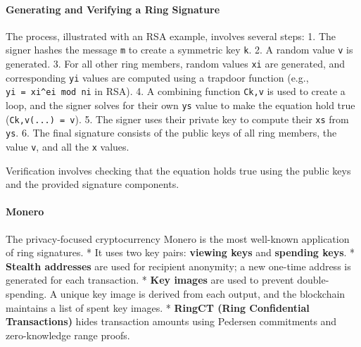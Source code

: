 \paragraph{Generating and Verifying a Ring
Signature}\label{generating-and-verifying-a-ring-signature}

The process, illustrated with an RSA example, involves several steps: 1.
The signer hashes the message \texttt{m} to create a symmetric key
\texttt{k}. 2. A random value \texttt{v} is generated. 3. For all other
ring members, random values \texttt{xi} are generated, and corresponding
\texttt{yi} values are computed using a trapdoor function (e.g.,
\texttt{yi\ =\ xi\^{}ei\ mod\ ni} in RSA). 4. A combining function
\texttt{Ck,v} is used to create a loop, and the signer solves for their
own \texttt{ys} value to make the equation hold true
(\texttt{Ck,v(...)\ =\ v}). 5. The signer uses their private key to
compute their \texttt{xs} from \texttt{ys}. 6. The final signature
consists of the public keys of all ring members, the value \texttt{v},
and all the \texttt{x} values.

Verification involves checking that the equation holds true using the
public keys and the provided signature components.


\paragraph{Monero}\label{monero}

The privacy-focused cryptocurrency Monero is the most well-known
application of ring signatures. * It uses two key pairs: \textbf{viewing
keys} and \textbf{spending keys}. * \textbf{Stealth addresses} are used
for recipient anonymity; a new one-time address is generated for each
transaction. * \textbf{Key images} are used to prevent double-spending.
A unique key image is derived from each output, and the blockchain
maintains a list of spent key images. * \textbf{RingCT (Ring
Confidential Transactions)} hides transaction amounts using Pedersen
commitments and zero-knowledge range proofs.

